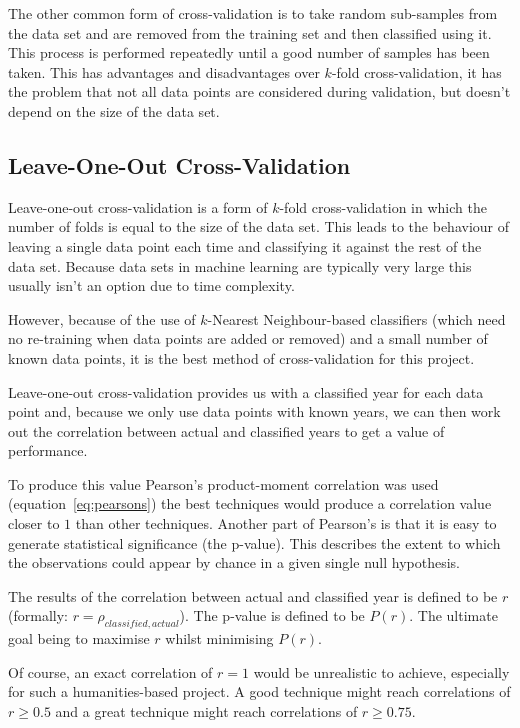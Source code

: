 The other common form of cross-validation is to take random sub-samples from the data set and are
removed from the training set and then classified using it. This process is performed repeatedly
until a good number of samples has been taken. This has advantages and disadvantages over $k$-fold
cross-validation, it has the problem that not all data points are considered during validation,
but doesn't depend on the size of the data set.


\subsection{Leave-One-Out Cross-Validation}
Leave-one-out cross-validation is a form of $k$-fold cross-validation in which the number of folds
is equal to the size of the data set. This leads to the behaviour of leaving a single data point
each time and classifying it against the rest of the data set. Because data sets in machine 
learning are typically very large this usually isn't an option due to time complexity.

However, because of the use of $k$-Nearest Neighbour-based classifiers (which need no re-training 
when data points are added or removed) and a small number of known data points, it is the best 
method of cross-validation for this project.

Leave-one-out cross-validation provides us with a classified year for each data point and, because
we only use data points with known years, we can then work out the correlation between actual and
classified years to get a value of performance.

To produce this value Pearson's product-moment correlation was used (equation~\ref{eq:pearsons})
the best techniques would produce a correlation value closer to $1$ than other techniques. Another
part of Pearson's is that it is easy to generate statistical significance (the p-value). This
describes the extent to which the observations could appear by chance in a given single null
hypothesis.

The results of the correlation between actual and classified year is defined to be $r$ 
(formally: $r=\rho_{classified, actual}$). The p-value is defined to be $P(r)$. The ultimate goal 
being to maximise $r$ whilst minimising $P(r)$.

Of course, an exact correlation of $r=1$ would be unrealistic to achieve, especially for such a 
humanities-based project. A good technique might reach correlations of $r \ge 0.5$ and a great
technique might reach correlations of $r \ge 0.75$.



